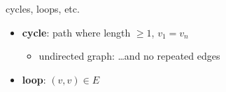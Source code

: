 \begin{frame}{cycles, loops, etc.}
\begin{itemize}
\item \textbf{cycle}: path where length $\ge 1$, $v_1=v_n$
\begin{itemize}
\item undirected graph: \ldots and no repeated edges
\end{itemize}
\item \textbf{loop}: $(v,v) \in E$
\end{itemize}
\end{frame}
